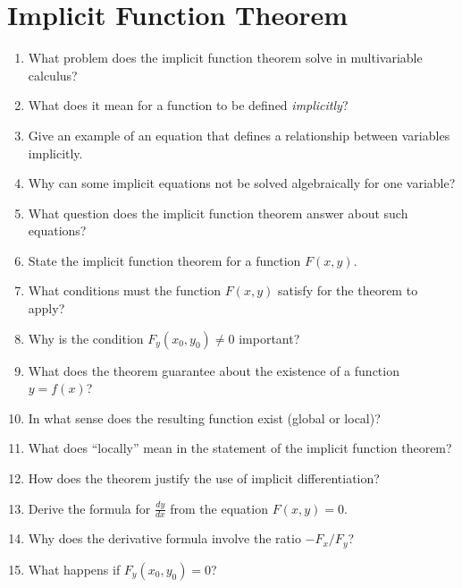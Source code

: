 \section*{Implicit Function Theorem}

\begin{enumerate}

\item What problem does the implicit function theorem solve in multivariable calculus?

\item What does it mean for a function to be defined \emph{implicitly}?

\item Give an example of an equation that defines a relationship between variables implicitly.

\item Why can some implicit equations not be solved algebraically for one variable?

\item What question does the implicit function theorem answer about such equations?

\item State the implicit function theorem for a function \(F(x,y)\).

\item What conditions must the function \(F(x,y)\) satisfy for the theorem to apply?

\item Why is the condition \(F_y(x_0,y_0) \neq 0\) important?

\item What does the theorem guarantee about the existence of a function \(y=f(x)\)?

\item In what sense does the resulting function exist (global or local)?

\item What does ``locally'' mean in the statement of the implicit function theorem?

\item How does the theorem justify the use of implicit differentiation?

\item Derive the formula for \(\frac{dy}{dx}\) from the equation \(F(x,y)=0\).

\item Why does the derivative formula involve the ratio \(-F_x/F_y\)?

\item What happens if \(F_y(x_0,y_0)=0\)?


\end{enumerate}
